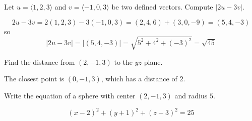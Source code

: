 \documentclass[addpoints]{exam}
\begin{document}
\printanswers
\begin{questions}
\question[20]  Let $u = \langle 1,2,3 \rangle$ and $v = \langle -1, 0, 3 \rangle$ be two defined vectors. 
Compute $|2u - 3v|$. 
\begin{solution}
\[
2u - 3v = 2(1,2,3) - 3(-1,0,3) = (2,4,6) + (3, 0, -9) = (5,4,-3)
\]
so
\[
|2u - 3v| = |(5,4,-3)| = \sqrt{5^2 + 4^2 + (-3)^2} = \sqrt{45}
\]
\end{solution}
\question[20] Find the distance from $(2,-1,3)$ to the $yz$-plane. 
\begin{solution}
The closest point is $(0,-1,3)$, which has a distance of $2$. 
\end{solution}
\question[20] Write the equation of a sphere with center $(2,-1,3)$ and radius $5$. 
\begin{solution}
\[
(x-2)^2 + (y+1)^2 + (z-3)^2 = 25
\]
\end{solution}


\end{questions}
\end{document}
